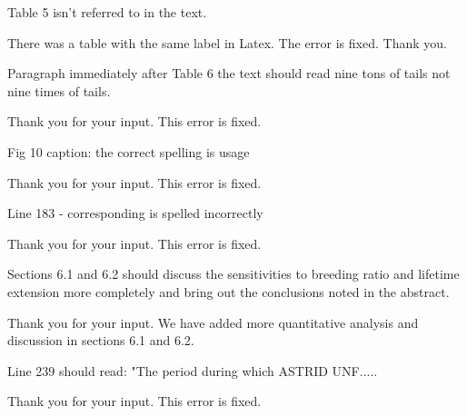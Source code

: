 \documentclass[answers,11pt]{exam}
\begin{document}
\begin{questions}
        \question Table 5 isn't referred to in the text.

        \begin{solution}
                There was a table with the same label in Latex. The error
                is fixed. Thank you.
        \end{solution}

        \question Paragraph immediately after Table 6 the text should read nine 
        tons of tails not nine times of tails.
        \begin{solution}
                Thank you for your input. This error is fixed.
        \end{solution}

        \question Fig 10 caption: the correct spelling is usage

        \begin{solution}
                Thank you for your input. This error is fixed.
        \end{solution}

        \question Line 183 - corresponding is spelled incorrectly
        \begin{solution}
                Thank you for your input. This error is fixed.
        \end{solution}

        \question Sections 6.1 and 6.2 should discuss the sensitivities to 
        breeding ratio and lifetime extension more completely and bring out the 
        conclusions noted in the abstract.

        \begin{solution}
                Thank you for your input. We have added more quantitative
                analysis and discussion in sections 6.1 and 6.2.
        \end{solution}

        \question Line 239 should read: "The period during which ASTRID UNF.....
        \begin{solution}
                Thank you for your input. This error is fixed.
        \end{solution}


\end{questions}
\end{document}
